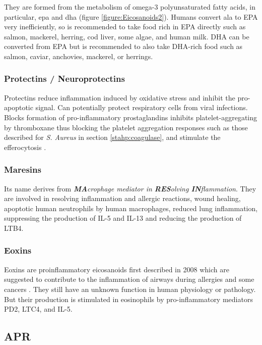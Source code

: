 They are formed from the metabolism of omega-3 polyunsaturated fatty acids, in particular, \gls{epa} and \gls{dha} (figure \ref{figure:Eicosanoids2}). Humans convert \gls{ala} to EPA very inefficiently, so is recommended to take food rich in EPA directly such as salmon, mackerel, herring, cod liver, some algae, and human milk. DHA can be converted from EPA but is recommended to also take DHA-rich food such as salmon, caviar, anchovies, mackerel, or herrings.

\subsubsection{Protectins / Neuroprotectins }

Protectins reduce inflammation induced by oxidative stress and inhibit the pro-apoptotic signal. Can potentially protect respiratory cells from viral infections. Blocks formation of pro-inflammatory prostaglandins inhibits platelet-aggregating by thromboxane thus blocking the platelet aggregation responses such as those described for \textit{S. Aureus} in section \ref{stahp:coagulase}, and stimulate the efferocytosis \cite{Lagarde2014, Serhan2015}.

\subsubsection{Maresins}

Its name derives from \textit{\textbf{MA}crophage mediator in \textbf{RES}olving \textbf{IN}flammation}. They are involved in resolving inflammation and allergic reactions, wound healing, apoptotic human neutrophils by human macrophages, reduced lung inflammation, suppressing the production of IL-5 and IL-13 and reducing the production of LTB4.

\subsubsection{Eoxins}

Eoxins are proinflammatory eicosanoids first described in 2008 \cite{Feltenmark2008} which are suggested to contribute to the inflammation of airways during allergies and some cancers \cite{Claesson2009}. They still have an unknown function in human physiology or pathology. But their production is stimulated in eosinophils by pro-inflammatory mediators PD2, LTC4, and IL-5.

\subsection{APR}

